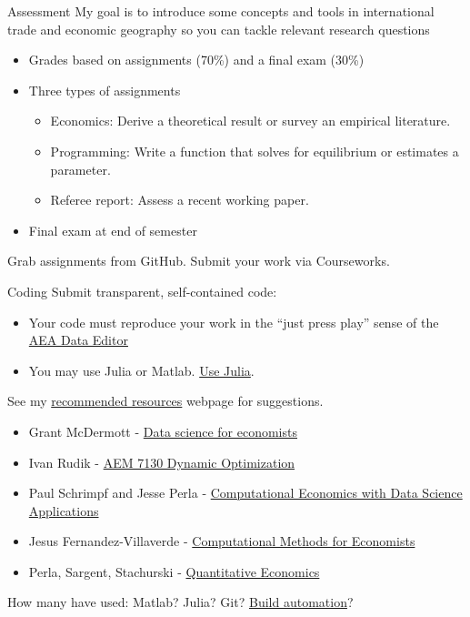 \documentclass[10pt,notes=hide,aspectratio=169]{beamer}
\begin{document}
\begin{frame}{Assessment}
My goal is to introduce some concepts and tools in international trade and economic geography so you can tackle relevant research questions
\begin{itemize}
\item Grades based on assignments (70\%) and a final exam (30\%)
\item Three types of assignments
\begin{itemize}
\item Economics: Derive a theoretical result or survey an empirical literature.
\item Programming: Write a function that solves for equilibrium or estimates a parameter.
\item Referee report: Assess a recent working paper.
\end{itemize}
\item Final exam at end of semester
\end{itemize}
Grab assignments from GitHub.
Submit your work via Courseworks.
\end{frame}
\begin{frame}{Coding}
Submit transparent, self-contained code:
\begin{itemize}
\item Your code must reproduce your work in the ``just press play'' sense of the \href{https://www.aeaweb.org/journals/data/faq\#run}{AEA Data Editor}
\item You may use Julia or Matlab. \href{https://tradediversion.net/2018/09/17/why-i-encourage-econ-phd-students-to-learn-julia/}{Use Julia}.
\end{itemize}
See my \href{http://www.jdingel.com/teaching/advice.html}{recommended resources} webpage for suggestions.
\begin{itemize}
\item Grant McDermott - \href{https://github.com/uo-ec607/lectures}{Data science for economists}
\item Ivan Rudik - \href{https://github.com/AEM7130/class-repo}{AEM 7130 Dynamic Optimization}
\item Paul Schrimpf and Jesse Perla - \href{https://github.com/ubcecon/ECON622/}{Computational Economics with Data Science Applications}
\item Jesus Fernandez-Villaverde - \href{https://www.sas.upenn.edu/~jesusfv/teaching.html}{Computational Methods for Economists}
\item Perla, Sargent, Stachurski - \href{https://julia.quantecon.org/intro.html}{Quantitative Economics}
\end{itemize}
How many have used: Matlab? Julia? Git? \href{https://tradediversion.net/2019/11/06/why-your-research-project-needs-build-automation/}{Build automation}?
\end{frame}
\end{document}
